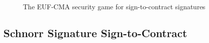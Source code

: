 \begin{figure}[tbh]
  \begin{tcolorbox}
    \begin{pchstack}[center]
      \pchspace
    \end{pchstack}
  \end{tcolorbox}
  \caption{The EUF-CMA security game for sign-to-contract signatures}
  \label{fig:euf-cma-s2c}
\end{figure}

\begin{definition}\label{def:euf-cma-s2c}
\end{definition}


\subsection{Schnorr Signature Sign-to-Contract}

